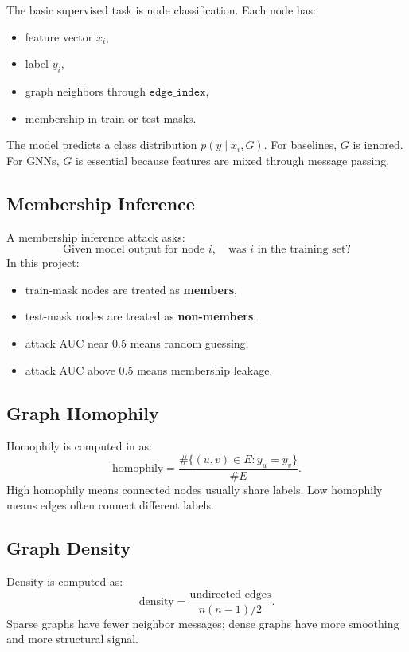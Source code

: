 \documentclass[10pt,a4paper]{article}
\newcommand{\file}[1]{\texttt{\detokenize{#1}}}
\begin{document}
The basic supervised task is node classification. Each node has:
\begin{itemize}
  \item feature vector \(x_i\),
  \item label \(y_i\),
  \item graph neighbors through \(\texttt{edge\_index}\),
  \item membership in train or test masks.
\end{itemize}

The model predicts a class distribution \(p(y \mid x_i, G)\). For baselines, \(G\) is ignored. For GNNs, \(G\) is essential because features are mixed through message passing.

\subsection{Membership Inference}

A membership inference attack asks:
\[
\text{Given model output for node } i,\quad \text{was } i \text{ in the training set?}
\]
In this project:
\begin{itemize}
  \item train-mask nodes are treated as \textbf{members},
  \item test-mask nodes are treated as \textbf{non-members},
  \item attack AUC near 0.5 means random guessing,
  \item attack AUC above 0.5 means membership leakage.
\end{itemize}

\subsection{Graph Homophily}

Homophily is computed in \file{data.py} as:
\[
\text{homophily} =
\frac{\#\{(u,v)\in E: y_u = y_v\}}{\#E}.
\]
High homophily means connected nodes usually share labels. Low homophily means edges often connect different labels.

\subsection{Graph Density}

Density is computed as:
\[
\text{density} =
\frac{\text{undirected edges}}{n(n-1)/2}.
\]
Sparse graphs have fewer neighbor messages; dense graphs have more smoothing and more structural signal.
\end{document}
